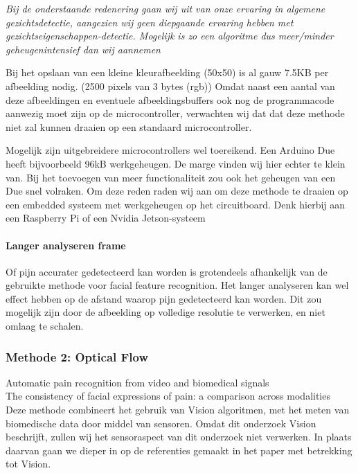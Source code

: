 \documentclass[11pt]{article}
\begin{document}
    \emph{Bij de onderstaande redenering gaan wij uit van onze ervaring in algemene gezichtsdetectie, aangezien wij geen diepgaande ervaring hebben met gezichtseigenschappen-detectie.
    Mogelijk is zo een algoritme dus meer/minder geheugenintensief dan wij aannemen}

    Bij het opslaan van een kleine kleurafbeelding (50x50) is al gauw 7.5KB per afbeelding nodig. (2500 pixels van 3 bytes (rgb))
    Omdat naast een aantal van deze afbeeldingen en eventuele afbeeldingsbuffers ook nog de programmacode aanwezig moet zijn op de microcontroller,
    verwachten wij dat dat deze methode niet zal kunnen draaien op een standaard microcontroller.


    Mogelijk zijn uitgebreidere microcontrollers wel toereikend.
    Een Arduino Due heeft bijvoorbeeld 96kB werkgeheugen.
    De marge vinden wij hier echter te klein van.
    Bij het toevoegen van meer functionaliteit zou ook het geheugen van een Due snel volraken.
    Om deze reden raden wij aan om deze methode te draaien op een embedded systeem met werkgeheugen op het circuitboard.
    Denk hierbij aan een Raspberry Pi of een Nvidia Jetson-systeem

    \paragraph{Langer analyseren frame}
    Of pijn accurater gedetecteerd kan worden is grotendeels afhankelijk van de gebruikte methode voor facial feature recognition.
    Het langer analyseren kan wel effect hebben op de afstand waarop pijn gedetecteerd kan worden.
    Dit zou mogelijk zijn door de afbeelding op volledige resolutie te verwerken, en niet omlaag te schalen.

    \subsubsection{Methode 2: Optical Flow}
    \emph{\citet{werner2014automatic}} Automatic pain recognition from video and biomedical signals\\
    \emph{\citet{prkachin1992consistency}} The consistency of facial expressions of pain: a comparison across modalities\\
    Deze methode combineert het gebruik van Vision algoritmen, met het meten van biomedische data door middel van sensoren.
    Omdat dit onderzoek Vision beschrijft, zullen wij het sensoraspect van dit onderzoek niet verwerken. In plaats daarvan gaan we dieper in op de referenties gemaakt in het paper met betrekking tot Vision.
\end{document}
